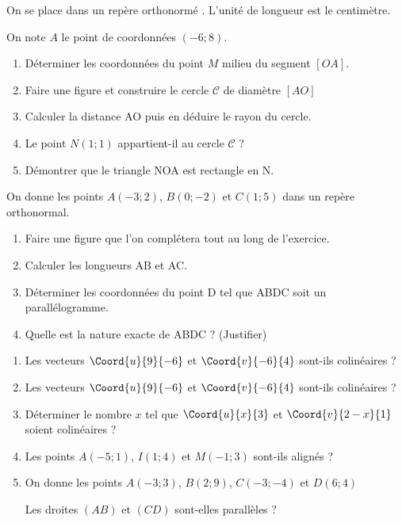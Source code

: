 \medskip

\exo 

On se place dans un repère orthonormé \Oij. L'unité de longueur est le centimètre.

On note $A$ le point de coordonnées $(-6 ; 8)$.

\begin{enumerate}
\item Déterminer les coordonnées du point $M$ milieu du segment $[OA]$.
\item Faire une figure et construire le cercle $\mathscr{C}$ de diamètre $[AO]$
\item Calculer la distance AO puis en déduire le rayon du cercle.
\item Le point $N(1;1)$ appartient-il au cercle $\mathscr{C}$ ?
\item Démontrer que le triangle NOA est rectangle en N. 
\end{enumerate} 

\medskip

\exo

On donne les points $A(-3;2)$, $B(0 ; -2)$ et $C(1 ; 5)$ dans un repère orthonormal.

\begin{enumerate}
\item Faire une figure que l'on complétera tout au long de l'exercice.
\item Calculer les longueurs AB et AC.
\item Déterminer les coordonnées du point D tel que ABDC soit un parallélogramme.
\item Quelle est la nature exacte de ABDC ? (Justifier)
\end{enumerate}

\medskip

\exo

\begin{enumerate}
\item Les vecteurs $\Coord{u}{9}{-6}$ et $\Coord{v}{-6}{4}$ sont-ils colinéaires ?
\item Les vecteurs $\Coord{u}{9}{-6}$ et $\Coord{v}{-6}{4}$ sont-ils colinéaires ?
\item Déterminer le nombre $x$ tel que $\Coord{u}{x}{3}$ et $\Coord{v}{2-x}{1}$ soient colinéaires ?
\item Les points $A(-5 ;1)$, $I(1 ;4)$ et $M(-1 ; 3)$ sont-ils alignés ?
\item On donne les points $A(-3 ; 3)$, $B(2;9)$, $C(-3 ;-4)$ et $D(6;4)$

Les droites $(AB)$ et $(CD)$ sont-elles parallèles ?
\end{enumerate}

